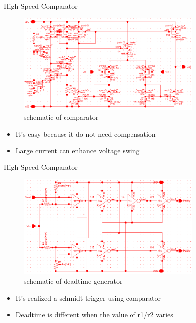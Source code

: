 \documentclass[10pt,mathserif]{beamer}%
\begin{document}
\begin{frame}{High Speed Comparator}
    \begin{figure}
    \includegraphics[width=0.8\textwidth]{images/comparator.bmp}
    \caption{schematic of comparator}
    \end{figure}
    \begin{itemize}
        \item It's easy because it do not need compensation
        \item Large current can enhance voltage swing
    \end{itemize}
\end{frame}

\begin{frame}{High Speed Comparator}
    \begin{figure}
    \includegraphics[width=0.8\textwidth]{images/pwm_with_deadtime.bmp}
    \caption{schematic of deadtime generator}
    \end{figure}
    \begin{itemize}
        \item It's realized a schmidt trigger using comparator
        \item Deadtime is different when the value of r1/r2 varies
    \end{itemize}
\end{frame}
\end{document}
